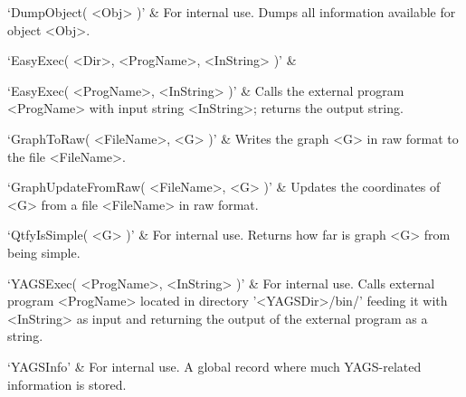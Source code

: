 `DumpObject( <Obj> )' & 
For internal use. Dumps  all information available for object <Obj>.

`EasyExec( <Dir>, <ProgName>, <InString> )' & 

`EasyExec( <ProgName>, <InString> )' & 
Calls the external program <ProgName> with input string <InString>; returns the output string.

`GraphToRaw( <FileName>, <G> )' & 
Writes the graph <G> in raw format to the file  <FileName>.

`GraphUpdateFromRaw( <FileName>, <G> )' & 
Updates  the  coordinates  of  <G>  from  a file <FileName> in raw format.

`QtfyIsSimple( <G> )' & 
For internal use. Returns how far is graph <G> from being simple.

`YAGSExec( <ProgName>, <InString> )' & 
For  internal  use.  Calls  external  program  <ProgName> located in directory
'<YAGSDir>/bin/'  feeding  it with <InString> as input and returning  the
output  of  the  external  program  as a string.

`YAGSInfo' &
For internal use. A global record where much YAGS-related information is stored.
\enditems

%
%
%
%


